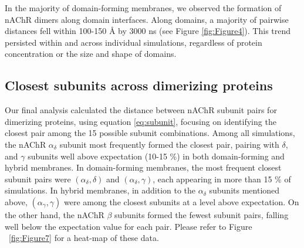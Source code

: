 

In the majority of domain-forming membranes, we observed the formation of nAChR dimers along domain interfaces. Along domains, a majority of pairwise distances  fell within 100-150 {\AA} by 3000 ns (see Figure \ref{fig:Figure4}). This trend persisted within and across individual simulations, regardless of protein concentration or the size and shape of domains.























\subsection{Closest subunits across dimerizing proteins}
Our final analysis calculated the distance between nAChR subunit pairs for dimerizing proteins, using equation \ref{eq:subunit}, focusing on identifying the closest pair among the 15 possible subunit combinations. Among all simulations, the nAChR $\alpha_{\delta}$ subunit most frequently formed the closest pair, pairing with $\delta$, and $\gamma$ subunits well above expectation (10-15 \%) in both domain-forming and hybrid membranes. In domain-forming membranes, the most frequent closest subunit pairs were $(\alpha_\delta, \delta)$ and $(\alpha_\delta, \gamma)$, each appearing in more than 15 \% of simulations. In hybrid membranes, in addition to the $\alpha_{\delta}$ subunits mentioned above, $(\alpha_\gamma, \gamma)$ were among the closest subunits at a level above expectation. On the other hand, the nAChR $\beta$ subunits formed the fewest subunit pairs, falling well below the expectation value for each pair. Please refer to Figure ~\ref{fig:Figure7} for a heat-map of these data.   


